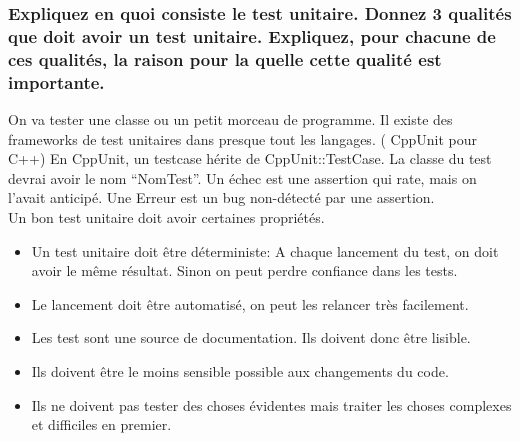 \subsubsection{Expliquez en quoi consiste le test unitaire. Donnez 3 qualités que doit avoir un test unitaire. Expliquez, pour chacune de ces qualités, la raison pour la quelle cette qualité est importante.}
On va tester une classe ou un petit morceau de programme.
Il existe des frameworks de test unitaires dans presque tout les langages. ( CppUnit pour C++) En CppUnit, un testcase hérite de CppUnit::TestCase. La classe du test devrai avoir le nom “NomTest”. Un échec est une assertion qui rate, mais on l’avait anticipé. Une Erreur est un bug non-détecté par une assertion.
\\Un bon test unitaire doit avoir certaines propriétés.
\begin{itemize}
	\item Un test unitaire doit être déterministe: A chaque lancement du test, on doit avoir le même résultat. Sinon on peut perdre confiance dans les tests.
	\item Le lancement doit être automatisé, on peut les relancer très facilement.
	\item Les test sont une source de documentation. Ils doivent donc être lisible.
	\item Ils doivent être le moins sensible possible aux changements du code.
	\item Ils ne doivent pas tester des choses évidentes mais traiter les choses complexes et difficiles en premier.
\end{itemize}
